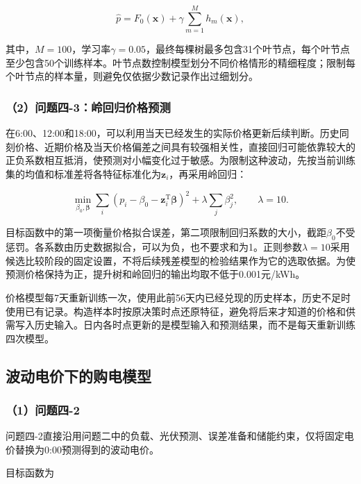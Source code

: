 \begin{equation}
\hat{p}
=
F_0(\mathbf{x})
+
\gamma
\sum_{m=1}^{M}
h_m(\mathbf{x}),
\end{equation}

其中，$M=100$，学习率$\gamma=0.05$，最终每棵树最多包含31个叶节点，每个叶节点至少包含50个训练样本。叶节点数控制模型划分不同价格情形的精细程度；限制每个叶节点的样本量，则避免仅依据少数记录作出过细划分。

\subsubsection*{（2）问题四-3：岭回归价格预测}

在6:00、12:00和18:00，可以利用当天已经发生的实际价格更新后续判断。历史同刻价格、近期价格及当天价格偏差之间具有较强相关性，直接回归可能依靠较大的正负系数相互抵消，使预测对小幅变化过于敏感。为限制这种波动，先按当前训练集的均值和标准差将各特征标准化为$\mathbf{z}_i$，再采用岭回归：

\begin{equation}
\min_{\beta_0,\boldsymbol{\beta}}
\sum_i
\left(
p_i-\beta_0-\mathbf{z}_i^{\mathrm T}\boldsymbol{\beta}
\right)^2
+
\lambda
\sum_j\beta_j^2,
\qquad
\lambda=10.
\end{equation}

目标函数中的第一项衡量价格拟合误差，第二项限制回归系数的大小，截距$\beta_0$不受惩罚。各系数由历史数据拟合，可以为负，也不要求和为1。正则参数$\lambda=10$采用候选比较阶段的固定设置，不将后续残差模型的检验结果作为它的选取依据。为使预测价格保持为正，提升树和岭回归的输出均取不低于0.001元/kWh。

价格模型每7天重新训练一次，使用此前56天内已经兑现的历史样本，历史不足时使用已有记录。构造样本时按原决策时点还原特征，避免将后来才知道的价格和供需写入历史输入。日内各时点更新的是模型输入和预测结果，而不是每天重新训练四次模型。


\subsection{波动电价下的购电模型}

\subsubsection*{（1）问题四-2}

问题四-2直接沿用问题二中的负载、光伏预测、误差准备和储能约束，仅将固定电价替换为0:00预测得到的波动电价。

目标函数为

